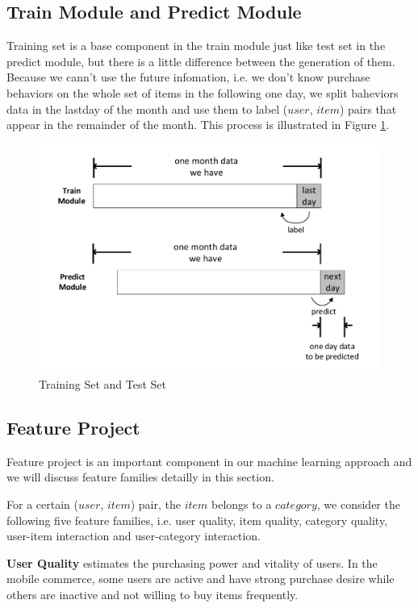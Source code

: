 \documentclass{llncs}
\begin{document}
\subsection{Train Module and Predict Module}
Training set is a base component in the train module just like
test set in the predict module,
but there is a little difference between the generation of them.
Because we cann't use the future infomation,
i.e. we don't know purchase behaviors
on the whole set of items in the following one day,
we split baheviors data in the lastday of the month
and use them to label ($user$, $item$) pairs that appear
in the remainder of the month.
This process is illustrated in Figure \ref{fig:train_and_test}.

\begin{figure}[htbp]
	\centering
	\includegraphics[scale=0.4]{images/train_and_test.pdf}
	\caption{Training Set and Test Set}
	\label{fig:train_and_test}
\end{figure}

\subsection{Feature Project}
Feature project is an important component in our machine learning approach
and we will discuss feature families detailly in this section.

For a certain ($user$, $item$) pair, the $item$ belongs to a $category$,
we consider the following five feature families,
i.e. user quality, item quality, category quality, user-item interaction
and user-category interaction.

\textbf{User Quality} estimates the purchasing power and vitality of users.
In the mobile commerce, some users are active and have strong purchase desire
while others are inactive and not willing to buy items frequently.
\end{document}
